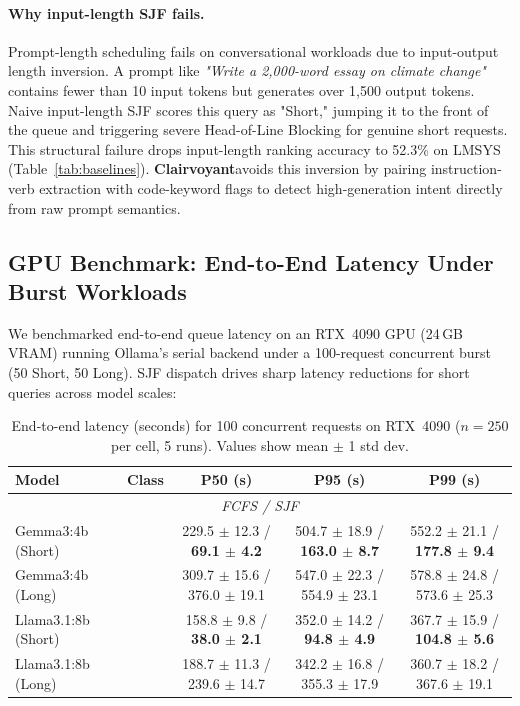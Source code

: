 \documentclass[10pt]{article}
\newcommand{\clairvoyant}{\textbf{Clairvoyant}}
\begin{document}
\paragraph{Why input-length SJF fails.}
Prompt-length scheduling fails on conversational workloads due to input-output length inversion. A prompt like \textit{"Write a 2,000-word essay on climate change"} contains fewer than 10 input tokens but generates over 1,500 output tokens. Naive input-length SJF scores this query as "Short," jumping it to the front of the queue and triggering severe Head-of-Line Blocking for genuine short requests. This structural failure drops input-length ranking accuracy to 52.3\% on LMSYS (Table~\ref{tab:baselines}). \clairvoyant avoids this inversion by pairing instruction-verb extraction with code-keyword flags to detect high-generation intent directly from raw prompt semantics.

\subsection{GPU Benchmark: End-to-End Latency Under Burst Workloads}
\label{sec:gpu}

We benchmarked end-to-end queue latency on an RTX~4090 GPU (24\,GB VRAM) running Ollama's serial backend under a 100-request concurrent burst (50 Short, 50 Long). SJF dispatch drives sharp latency reductions for short queries across model scales:

\begin{table}[H]
  \centering
  \caption{End-to-end latency (seconds) for 100 concurrent requests on RTX~4090 ($n=250$ per cell, 5 runs). Values show mean $\pm$ 1 std dev.}
  \label{tab:gpu}
  \small
  \begin{tabular}{llccc}
    \toprule
    Model & Class & P50 (s) & P95 (s) & P99 (s) \\
    \midrule
    \multicolumn{5}{c}{\textit{FCFS / SJF}} \\
    \midrule
    Gemma3:4b (Short)   & & 229.5 $\pm$ 12.3 / \textbf{69.1 $\pm$ 4.2} & 504.7 $\pm$ 18.9 / \textbf{163.0 $\pm$ 8.7} & 552.2 $\pm$ 21.1 / \textbf{177.8 $\pm$ 9.4} \\
    Gemma3:4b (Long)    & & 309.7 $\pm$ 15.6 / 376.0 $\pm$ 19.1         & 547.0 $\pm$ 22.3 / 554.9 $\pm$ 23.1         & 578.8 $\pm$ 24.8 / 573.6 $\pm$ 25.3 \\
    \midrule
    Llama3.1:8b (Short) & & 158.8 $\pm$ 9.8 / \textbf{38.0 $\pm$ 2.1}   & 352.0 $\pm$ 14.2 / \textbf{94.8 $\pm$ 4.9}  & 367.7 $\pm$ 15.9 / \textbf{104.8 $\pm$ 5.6} \\
    Llama3.1:8b (Long)  & & 188.7 $\pm$ 11.3 / 239.6 $\pm$ 14.7         & 342.2 $\pm$ 16.8 / 355.3 $\pm$ 17.9         & 360.7 $\pm$ 18.2 / 367.6 $\pm$ 19.1 \\
    \bottomrule
  \end{tabular}
\end{table}
\end{document}
